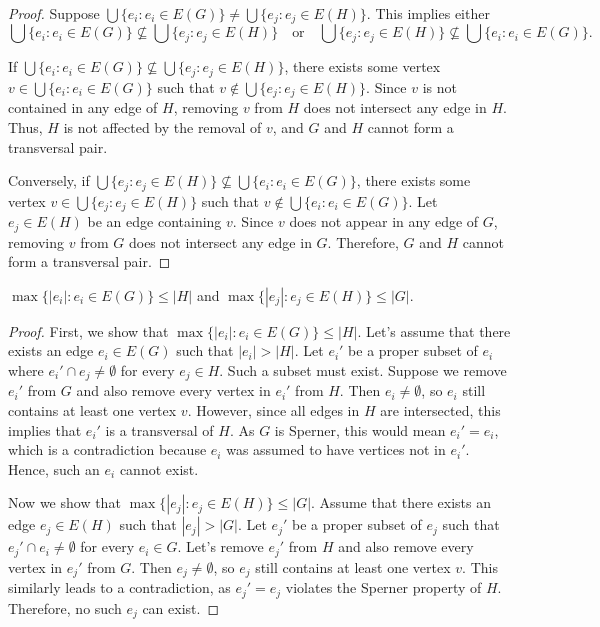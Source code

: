 \begin{proof}
Suppose $\bigcup\{e_i:e_i\in E(G)\}\neq\bigcup\{e_j:e_j\in E(H)\}$. This implies either
\[
\bigcup\{e_i:e_i\in E(G)\}\nsubseteq\bigcup\{e_j:e_j\in E(H)\}\quad\text{or}\quad\bigcup\{e_j:e_j\in E(H)\}\nsubseteq\bigcup\{e_i:e_i\in E(G)\}.
\]

If $\bigcup\{e_i:e_i\in E(G)\}\nsubseteq\bigcup\{e_j:e_j\in E(H)\}$, there exists some vertex $v\in\bigcup\{e_i:e_i\in E(G)\}$ such that $v\notin\bigcup\{e_j:e_j\in E(H)\}$. Since $v$ is not contained in any edge of $H$, removing $v$ from $H$ does not intersect any edge in $H$. Thus, $H$ is not affected by the removal of $v$, and $G$ and $H$ cannot form a transversal pair.

Conversely, if $\bigcup\{e_j:e_j\in E(H)\}\nsubseteq\bigcup\{e_i:e_i\in E(G)\}$, there exists some vertex $v\in\bigcup\{e_j:e_j\in E(H)\}$ such that $v\notin\bigcup\{e_i:e_i\in E(G)\}$. Let $e_j\in E(H)$ be an edge containing $v$. Since $v$ does not appear in any edge of $G$, removing $v$ from $G$ does not intersect any edge in $G$. Therefore, $G$ and $H$ cannot form a transversal pair.
\end{proof}

\begin{proposition}\label{prop:size}
$\max\{|e_i|:e_i\in E(G)\}\leq|H|$ and $\max\{|e_j|:e_j\in E(H)\}\leq|G|$.
\end{proposition}

\begin{proof}
First, we show that $\max\{|e_i|:e_i\in E(G)\}\leq|H|$. Let's assume that there exists an edge $e_i\in E(G)$ such that $|e_i|>|H|$. Let $e_i'$ be a proper subset of $e_i$ where $e_i'\cap e_j\neq\emptyset$ for every $e_j\in H$. Such a subset must exist. Suppose we remove $e_i'$ from $G$ and also remove every vertex in $e_i'$ from $H$. Then $e_i\neq\emptyset$, so $e_i$ still contains at least one vertex $v$. However, since all edges in $H$ are intersected, this implies that $e_i'$ is a transversal of $H$. As $G$ is Sperner, this would mean $e_i'=e_i$, which is a contradiction because $e_i$ was assumed to have vertices not in $e_i'$. Hence, such an $e_i$ cannot exist.

Now we show that $\max\{|e_j|:e_j\in E(H)\}\leq|G|$. Assume that there exists an edge $e_j\in E(H)$ such that $|e_j|>|G|$. Let $e_j'$ be a proper subset of $e_j$ such that $e_j'\cap e_i\neq\emptyset$ for every $e_i\in G$. Let's remove $e_j'$ from $H$ and also remove every vertex in $e_j'$ from $G$. Then $e_j\neq\emptyset$, so $e_j$ still contains at least one vertex $v$. This similarly leads to a contradiction, as $e_j'=e_j$ violates the Sperner property of $H$. Therefore, no such $e_j$ can exist.
\end{proof}

